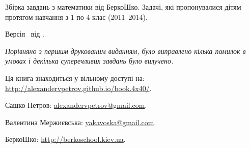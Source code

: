 
{
\fontsize{\OPTinfopagefontsize}{2.0\OPTinfopagefontsize}\selectfont

\noindent
Збірка завдань з математики від БеркоШко.
Задачі, які пропонувалися дітям протягом навчання з 1 по 4 клас (2011--2014).

\bigskip

\noindent
Версія \Version\ від \Date.

\bigskip

\noindent
\emph{Порівняно з першим друкованим виданням, було виправлено кілька помилок
в умовах і декілька суперечливих завдань було вилучено.}

\bigskip

\noindent
Ця книга знаходиться у вільному доступі на:\\
\url{http://alexandervpetrov.github.io/book.4x40/}.

\bigskip

\noindent
Сашко Петров: \href{mailto:alexandervpetrov@gmail.com}{alexandervpetrov@gmail.com}.

\noindent
Валентина Мержиєвська: \href{mailto:yakavoska@gmail.com}{yakavoska@gmail.com}.

\bigskip

\noindent
БеркоШко: \url{http://berkoschool.kiev.ua}.
}

\clearpage
